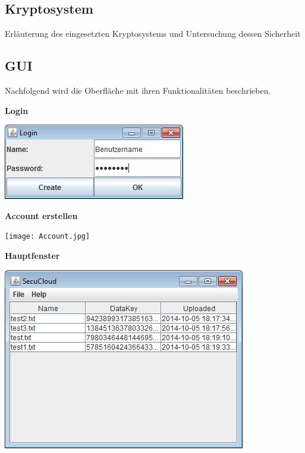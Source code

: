 \documentclass[12pt,a4paper,bibliography=totocnumbered,listof=totocnumbered]{scrartcl}
\begin{document}
\subsection{Kryptosystem}
Erläuterung des eingesetzten Kryptosystems und Untersuchung dessen Sicherheit

\subsection{GUI}
Nachfolgend wird die Oberfläche mit ihren Funktionalitäten beschrieben.

\textbf{Login}
\vspace{1em}
$\;$\\
\begin{minipage}{\linewidth}
	\centering
	\includegraphics[width=0.7\linewidth]{Login.jpg}
	\label{Login}
\end{minipage}
\vspace{1em}

\textbf{Account erstellen}
\vspace{1em}
$\;$\\
\begin{minipage}{\linewidth}
	\centering
	\texttt{[image: Account.jpg]}
	\label{Account}
\end{minipage}
\vspace{1em}

\textbf{Hauptfenster}
\vspace{1em}
$\;$\\
\begin{minipage}{\linewidth}
	\centering
	\includegraphics[width=0.7\linewidth]{Main.jpg}
	\label{Hauptfenster}
\end{minipage}
\vspace{1em}
\end{document}

